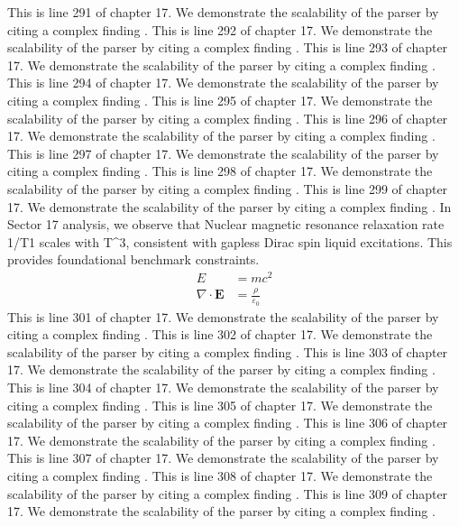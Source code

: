 This is line 291 of chapter 17. We demonstrate the scalability of the parser by citing a complex finding \cite{ref17_291}.
This is line 292 of chapter 17. We demonstrate the scalability of the parser by citing a complex finding \cite{ref17_292}.
This is line 293 of chapter 17. We demonstrate the scalability of the parser by citing a complex finding \cite{ref17_293}.
This is line 294 of chapter 17. We demonstrate the scalability of the parser by citing a complex finding \cite{ref17_294}.
This is line 295 of chapter 17. We demonstrate the scalability of the parser by citing a complex finding \cite{ref17_295}.
This is line 296 of chapter 17. We demonstrate the scalability of the parser by citing a complex finding \cite{ref17_296}.
This is line 297 of chapter 17. We demonstrate the scalability of the parser by citing a complex finding \cite{ref17_297}.
This is line 298 of chapter 17. We demonstrate the scalability of the parser by citing a complex finding \cite{ref17_298}.
This is line 299 of chapter 17. We demonstrate the scalability of the parser by citing a complex finding \cite{ref17_299}.
In Sector 17 analysis, we observe that Nuclear magnetic resonance relaxation rate 1/T1 scales with T^3, consistent with gapless Dirac spin liquid excitations. This provides foundational benchmark constraints.
\begin{align*}
  E &= mc^2 \\
  \nabla \cdot \mathbf{E} &= \frac{\rho}{\varepsilon_0}
\end{align*}
This is line 301 of chapter 17. We demonstrate the scalability of the parser by citing a complex finding \cite{ref17_301}.
This is line 302 of chapter 17. We demonstrate the scalability of the parser by citing a complex finding \cite{ref17_302}.
This is line 303 of chapter 17. We demonstrate the scalability of the parser by citing a complex finding \cite{ref17_303}.
This is line 304 of chapter 17. We demonstrate the scalability of the parser by citing a complex finding \cite{ref17_304}.
This is line 305 of chapter 17. We demonstrate the scalability of the parser by citing a complex finding \cite{ref17_305}.
This is line 306 of chapter 17. We demonstrate the scalability of the parser by citing a complex finding \cite{ref17_306}.
This is line 307 of chapter 17. We demonstrate the scalability of the parser by citing a complex finding \cite{ref17_307}.
This is line 308 of chapter 17. We demonstrate the scalability of the parser by citing a complex finding \cite{ref17_308}.
This is line 309 of chapter 17. We demonstrate the scalability of the parser by citing a complex finding \cite{ref17_309}.
